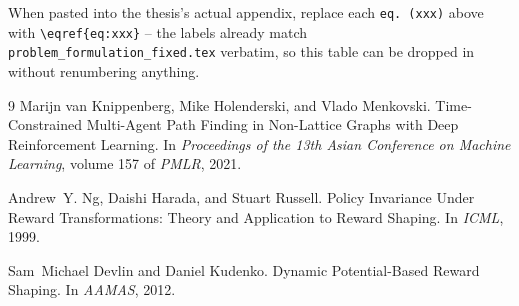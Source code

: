 \documentclass[11pt]{article}
\begin{document}
\noindent When pasted into the thesis's actual appendix, replace each
\texttt{eq.~(xxx)} above with \verb|\eqref{eq:xxx}| -- the labels already
match \texttt{problem\_formulation\_fixed.tex} verbatim, so this table can be
dropped in without renumbering anything.

\begin{thebibliography}{9}
Marijn van Knippenberg, Mike Holenderski, and Vlado Menkovski.
\newblock Time-Constrained Multi-Agent Path Finding in Non-Lattice Graphs
  with Deep Reinforcement Learning.
\newblock In \emph{Proceedings of the 13th Asian Conference on Machine
  Learning}, volume 157 of \emph{PMLR}, 2021.

Andrew~Y. Ng, Daishi Harada, and Stuart Russell.
\newblock Policy Invariance Under Reward Transformations: Theory and
  Application to Reward Shaping.
\newblock In \emph{ICML}, 1999.

Sam~Michael Devlin and Daniel Kudenko.
\newblock Dynamic Potential-Based Reward Shaping.
\newblock In \emph{AAMAS}, 2012.
\end{thebibliography}
\end{document}
